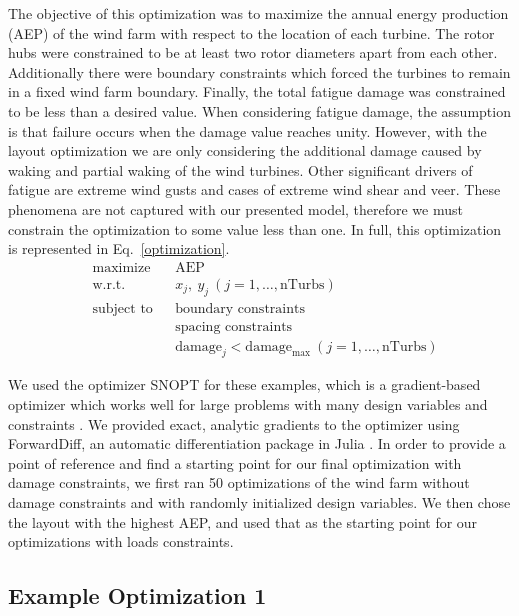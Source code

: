 \documentclass[11pt,letterpaper]{article}
\begin{document}
The objective of this optimization was to maximize the annual energy production (AEP) of the wind farm with respect to the location of each turbine. The rotor hubs were constrained to be at least two rotor diameters apart from each other. Additionally there were boundary constraints which forced the turbines to remain in a fixed wind farm boundary. Finally, the total fatigue damage was constrained to be less than a desired value. When considering fatigue damage, the assumption is that failure occurs when the damage value reaches unity. However, with the layout optimization we are only considering the additional damage caused by waking and partial waking of the wind turbines. Other significant drivers of fatigue are extreme wind gusts and cases of extreme wind shear and veer. These phenomena are not captured with our presented model, therefore we must constrain the optimization to some value less than one. In full, this optimization is represented in Eq.~\ref{optimization}.
% 
\begin{equation}
			\begin{aligned}
				& \text{maximize}
					& & \text{AEP} \\
                & \text{w.r.t.} 
                	&& x_j,~ y_j ~ (j = 1, \ldots, \text{nTurbs})\\
				& \text{subject to}
					& & \text{boundary constraints} \\
						&&& \text{spacing constraints} \\
						&&& \text{damage}_j < \text{damage}_\text{max} ~ (j = 1, \ldots, \text{nTurbs})
			\end{aligned}
		\label{optimization}
		\end{equation}

We used the optimizer SNOPT for these examples, which is a gradient-based optimizer which works well for large problems with many design variables and constraints \cite{gill2005snopt}. We provided exact, analytic gradients to the optimizer using ForwardDiff, an automatic differentiation package in Julia \cite{revels2016forward}.
In order to provide a point of reference and find a starting point for our final optimization with damage constraints, we first ran 50 optimizations of the wind farm without damage constraints and with randomly initialized design variables. We then chose the layout with the highest AEP, and used that as the starting point for our optimizations with loads constraints.


\subsection{Example Optimization 1}
\end{document}
